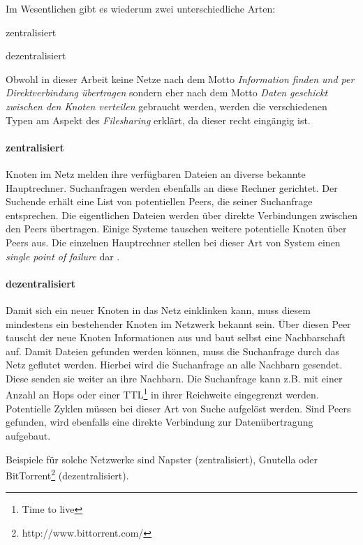 Im Wesentlichen gibt es wiederum zwei unterschiedliche Arten:
\begin{itemize*}
\item zentralisiert
\item dezentralisiert
\end{itemize*}

Obwohl in dieser Arbeit keine Netze nach dem Motto \emph{Information finden und per Direktverbindung übertragen} sondern eher nach dem Motto \emph{Daten geschickt zwischen den Knoten verteilen} gebraucht werden, werden die verschiedenen Typen am Aspekt des \emph{Filesharing} erklärt, da dieser recht eingängig ist.\\

\paragraph{zentralisiert} Knoten im Netz melden ihre verfügbaren Dateien an diverse bekannte Hauptrechner. Suchanfragen werden ebenfalls an diese Rechner gerichtet. Der Suchende erhält eine List von potentiellen Peers, die seiner Suchanfrage entsprechen. Die eigentlichen Dateien werden über direkte Verbindungen zwischen den Peers übertragen. Einige Systeme tauschen weitere potentielle Knoten über Peers aus. Die einzelnen Hauptrechner stellen bei dieser Art von System einen \emph{single point of failure} dar \cite{Eberspaecher2005}.

\paragraph{dezentralisiert} Damit sich ein neuer Knoten in das Netz einklinken kann, muss diesem mindestens ein bestehender Knoten im Netzwerk bekannt sein. Über diesen Peer tauscht der neue Knoten Informationen aus und baut selbst eine Nachbarschaft auf. Damit Dateien gefunden werden können, muss die Suchanfrage durch das Netz geflutet werden. Hierbei wird die Suchanfrage an alle Nachbarn gesendet. Diese senden sie weiter an ihre Nachbarn. Die Suchanfrage kann z.B. mit einer Anzahl an Hops oder einer TTL\footnote{Time to live} in ihrer Reichweite eingegrenzt werden. Potentielle Zyklen müssen bei dieser Art von Suche aufgelöst werden. Sind Peers gefunden, wird ebenfalls eine direkte Verbindung zur Datenübertragung aufgebaut.

Beispiele für solche Netzwerke sind Napster (zentralisiert), Gnutella oder BitTorrent\footnote{http://www.bittorrent.com/} (dezentralisiert).

